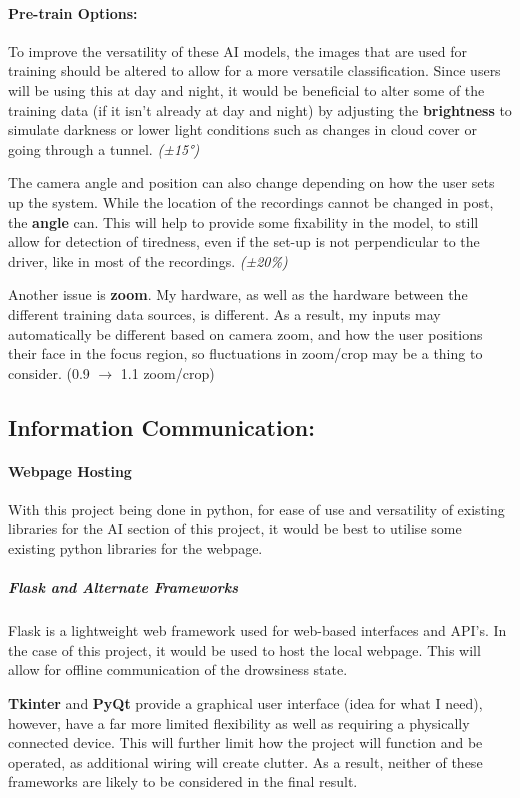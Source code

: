 \paragraph{Pre-train Options:}
To improve the versatility of these AI models, the images that are used for training should be altered to allow for a more versatile
classification. 
Since users will be using this at day and night, it would be beneficial to alter some of the training data (if it isn’t already at
day and night) by adjusting the \textbf{brightness} to simulate darkness or lower light conditions such as changes in cloud cover or
going through a tunnel. \textit{(±15°)}

The camera angle and position can also change depending on how the user sets up the system. While the location of the recordings
cannot be changed in post, the \textbf{angle} can. This will help to provide some fixability in the model, to still allow for detection
of tiredness, even if the set-up is not perpendicular to the driver, like in most of the recordings. \textit{(±20\%)}

Another issue is \textbf{zoom}. My hardware, as well as the hardware between the different training data sources, is different. As a
result, my inputs may automatically be different based on camera zoom, and how the user positions their face in the focus region,
so fluctuations in zoom/crop may be a thing to consider.  (0.9 $\to$ 1.1 zoom/crop)

\subsection{Information Communication:}
\paragraph{Webpage Hosting}
With this project being done in python, for ease of use and versatility of existing libraries for the AI section of this project, it
would be best to utilise some existing python libraries for the webpage.

\subparagraph{Flask and Alternate Frameworks}
Flask is a lightweight web framework used for web-based interfaces and API’s. In the case of this project, it would be used to host
the local webpage. This will allow for offline communication of the drowsiness state. 

\textbf{Tkinter} and \textbf{PyQt} provide a graphical user interface (idea for what I need), however, have a far more limited flexibility as well as
requiring a physically connected device. This will further limit how the project will function and be operated, as additional wiring
will create clutter. As a result, neither of these frameworks are likely to be considered in the final result.

